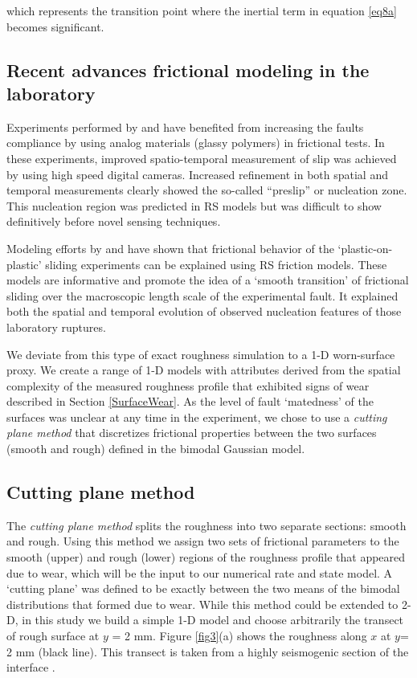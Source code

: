 \documentclass[final,3p, 11pt,authoryear]{elsarticle}
\begin{document}
\noindent which represents the transition point where the inertial term in equation \eqref{eq8a} becomes significant. 

\subsection{Recent advances frictional modeling in the laboratory}
\label{advances RSF}
Experiments performed by \citet{Nielsen2010} and \citet{Latour2013} have benefited from increasing the faults compliance by using analog materials (glassy polymers) in frictional tests. In these experiments, improved spatio-temporal measurement of slip was achieved by using high speed digital cameras. Increased refinement in both spatial and temporal measurements clearly showed the so-called ``preslip'' or nucleation zone.  This nucleation region was predicted in RS models \citep{Dieterich1992, Rubin2005, Ampuero2008} but was difficult to show definitively before novel sensing techniques.

Modeling efforts by \citet{Kaneko2011} and \citet{Kaneko2016} have shown that frictional behavior of the `plastic-on-plastic' sliding experiments can be explained using RS friction models. These models are informative and promote the idea of a `smooth transition' of frictional sliding over the macroscopic length scale of the experimental fault. It explained both the spatial and temporal evolution of observed nucleation features of those laboratory ruptures.

We deviate from this type of exact roughness simulation \citep{Ozawa2019, Tal2018} to a 1-D worn-surface proxy. We create a range of 1-D models with attributes derived from the spatial complexity of the measured roughness profile that exhibited signs of wear described in Section \ref{SurfaceWear}.  As the level of fault `matedness' of the surfaces was unclear at any time in the experiment, we chose to use a \textit{cutting plane method} that discretizes frictional properties between the two surfaces (smooth and rough) defined in the  bimodal Gaussian model.

\subsection{Cutting plane method}

The \textit{cutting plane method} splits the roughness into two separate sections: smooth and rough. Using this method we assign two sets of frictional parameters to the smooth (upper) and rough (lower) regions of the roughness profile that appeared due to wear, which will be the input to our numerical rate and state model. A `cutting plane' was defined to be exactly between the two means of the bimodal distributions that formed due to wear. While this method could be extended to 2-D, in this study we build a simple 1-D model and choose arbitrarily the transect of rough surface at $y$ = 2 mm. Figure \ref{fig3}(a) shows the roughness along $x$ at $y$= 2 mm (black line).  This transect is taken from a highly seismogenic section of the interface \citep{Selvadurai2015}. 
\end{document}
